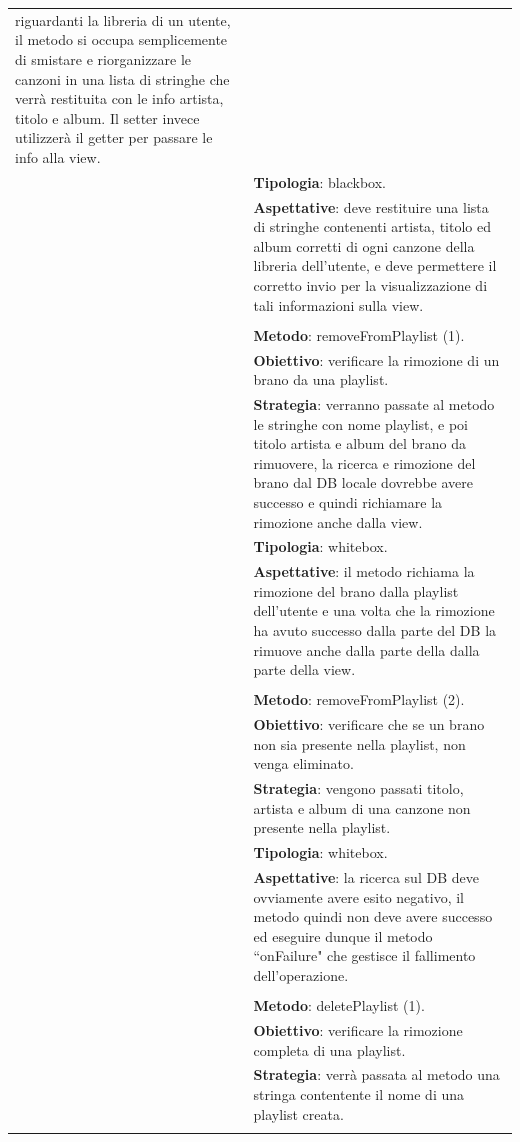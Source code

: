 \begin{footnotesize}
\begin{longtable}{|p{5.7cm}|p{10.3cm}|}
riguardanti la libreria di un utente, il metodo si occupa semplicemente di
smistare e riorganizzare le canzoni in una lista di stringhe che verr\`a
restituita con le info artista, titolo e album. Il setter invece utilizzer\`a
il getter per passare le info alla view.\\&
\textbf{Tipologia}: blackbox.\\&
\textbf{Aspettative}: deve
restituire una lista di stringhe contenenti artista, titolo ed album corretti di
ogni canzone della libreria dell'utente, e deve permettere il corretto invio per
la visualizzazione di tali informazioni sulla view.\\&
\\&
\textbf{Metodo}: removeFromPlaylist (1).\\&
\textbf{Obiettivo}: verificare la rimozione di un brano da una
playlist.\\& 
\textbf{Strategia}: verranno passate al metodo le stringhe con nome playlist,
e poi titolo artista e album del brano da rimuovere, la ricerca e rimozione
del brano dal DB locale dovrebbe avere successo e quindi richiamare la
rimozione anche dalla view.\\&
\textbf{Tipologia}: whitebox.\\&
\textbf{Aspettative}: il metodo richiama la
rimozione del brano dalla playlist dell'utente e una volta che la rimozione ha
avuto successo dalla parte del DB la rimuove anche dalla parte della dalla parte
della view.\\&
\\&
\textbf{Metodo}: removeFromPlaylist (2).\\&
\textbf{Obiettivo}: verificare che se un brano non sia presente nella
playlist, non venga eliminato.\\&
\textbf{Strategia}: vengono passati titolo, artista e album di una canzone non
presente nella playlist.\\&
\textbf{Tipologia}: whitebox.\\&
\textbf{Aspettative}: la ricerca sul DB deve ovviamente avere esito
negativo, il metodo quindi non deve avere successo ed eseguire dunque il
metodo ``onFailure" che gestisce il fallimento dell'operazione.\\&
\\&
\textbf{Metodo}: deletePlaylist (1).\\&
\textbf{Obiettivo}: verificare la rimozione completa di una
playlist.\\& 
\textbf{Strategia}: verr\`a passata al metodo una stringa contentente il nome
di una playlist creata.\\& 

\end{longtable}
\end{footnotesize}

